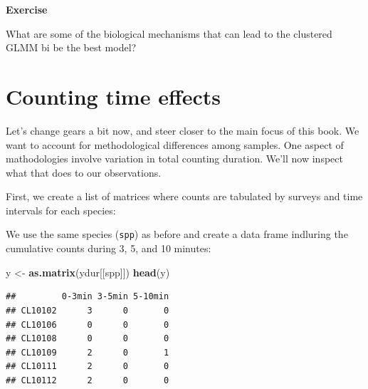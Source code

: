 \documentclass[12pt,]{book}
\newenvironment{Shaded}{\begin{snugshade}}{\end{snugshade}}
\newcommand{\KeywordTok}[1]{\textcolor[rgb]{0.13,0.29,0.53}{\textbf{#1}}}
\newcommand{\NormalTok}[1]{#1}
\newcommand{\OperatorTok}[1]{\textcolor[rgb]{0.81,0.36,0.00}{\textbf{#1}}}
\newcommand{\StringTok}[1]{\textcolor[rgb]{0.31,0.60,0.02}{#1}}
\let\BeginKnitrBlock\begin \let\EndKnitrBlock\end
\begin{document}
\BeginKnitrBlock{rmdexercise}
\textbf{Exercise}

What are some of the biological mechanisms that can lead to the
clustered GLMM bi be the best model?
\EndKnitrBlock{rmdexercise}

\hypertarget{counting-time-effects}{%
\section{Counting time effects}\label{counting-time-effects}}

Let's change gears a bit now, and steer closer to the main focus
of this book. We want to account for methodological differences
among samples. One aspect of mathodologies involve
variation in total counting duration. We'll now inspect what
that does to our observations.

First, we create a list of matrices where counts are
tabulated by surveys and time intervals for each species:

\begin{Shaded}
\end{Shaded}

We use the same species (\texttt{spp}) as before and create a
data frame indluring the cumulative counts during 3, 5, and 10 minutes:

\begin{Shaded}
\begin{Highlighting}[]
\NormalTok{y <-}\StringTok{ }\KeywordTok{as.matrix}\NormalTok{(ydur[[spp]])}
\KeywordTok{head}\NormalTok{(y)}
\end{Highlighting}
\end{Shaded}

\begin{verbatim}
##         0-3min 3-5min 5-10min
## CL10102      3      0       0
## CL10106      0      0       0
## CL10108      0      0       0
## CL10109      2      0       1
## CL10111      2      0       0
## CL10112      2      0       0
\end{verbatim}
\end{document}
